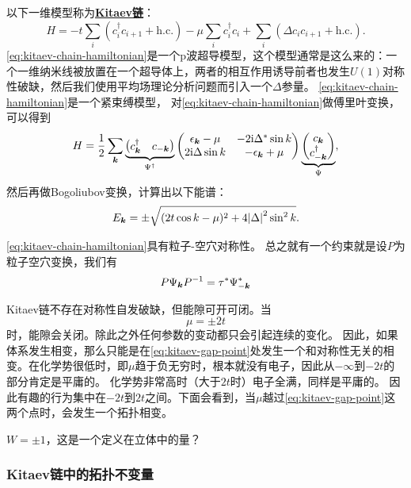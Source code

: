 \documentclass[hyperref, UTF8, a4paper]{ctexart}
\newcommand*{\ii}{\mathrm{i}}
\newcommand*{\concept}[1]{\underline{\textbf{#1}}}
\begin{document}
以下一维模型称为\concept{Kitaev链}：
\begin{equation}
    {H} = - t \sum_i ({c}_i^\dagger {c}_{i+1} + \text{h.c.}) - \mu \sum_i {c}_i^\dagger {c}_i + \sum_i (\Delta {c}_i {c}_{i+1} + \text{h.c.} ).
    \label{eq:kitaev-chain-hamiltonian}
\end{equation}
\eqref{eq:kitaev-chain-hamiltonian}是一个p波超导模型，这个模型通常是这么来的：一个一维纳米线被放置在一个超导体上，两者的相互作用诱导前者也发生$U(1)$对称性破缺，然后我们使用平均场理论分析问题而引入一个$\Delta$参量。
\eqref{eq:kitaev-chain-hamiltonian}是一个紧束缚模型，
对\eqref{eq:kitaev-chain-hamiltonian}做傅里叶变换，可以得到
\begin{equation}
    {H} = \frac{1}{2} \sum_{\vb*{k}} \underbrace{\pmqty{{c}^\dagger_{\vb*{k}} & {c}_{-\vb*{k}}}}_{{\Psi}^\dagger} \pmqty{\epsilon_{\vb*{k}} - \mu & -2 \ii \Delta^* \sin k \\ 2 \ii \Delta \sin k & - \epsilon_{\vb*{k}} + \mu} \underbrace{\pmqty{{c}_{\vb*{k}} \\ {c}^\dagger_{-\vb*{k}}}}_{{\Psi}},
\end{equation}
然后再做Bogoliubov变换，计算出以下能谱：
\begin{equation}
    E_{\vb*{k}} = \pm \sqrt{(2t \cos k - \mu)^2 + 4 \abs{\Delta}^2 \sin^2 k}.
\end{equation}

\eqref{eq:kitaev-chain-hamiltonian}具有粒子-空穴对称性。%
总之就有一个约束就是设$P$为粒子空穴变换，我们有
\[
    P {\Psi}_{\vb*{k}} P^{-1} = \tau^* {\Psi}_{-\vb*{k}}^*
\]

Kitaev链不存在对称性自发破缺，但能隙可开可闭。当
\begin{equation}
    \mu = \pm 2t
    \label{eq:kitaev-gap-point}
\end{equation}
时，能隙会关闭。除此之外任何参数的变动都只会引起连续的变化。
因此，如果体系发生相变，那么只能是在\eqref{eq:kitaev-gap-point}处发生一个和对称性无关的相变。在化学势很低时，即$\mu$趋于负无穷时，根本就没有电子，因此从$-\infty$到$-2t$的部分肯定是平庸的。
化学势非常高时（大于$2t$时）电子全满，同样是平庸的。
因此有趣的行为集中在$-2t$到$2t$之间。下面会看到，当$\mu$越过\eqref{eq:kitaev-gap-point}这两个点时，会发生一个拓扑相变。

$W = \pm 1$，这是一个定义在立体中的量？

\subsubsection{Kitaev链中的拓扑不变量}
\end{document}
